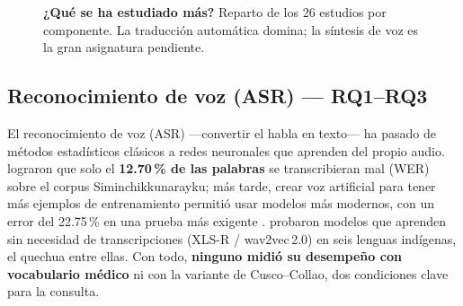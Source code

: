 \documentclass[10pt,twocolumn,a4paper]{article}
\begin{document}
\begin{figure}[t]
\centering
{}
\caption{\textbf{¿Qu\'e se ha estudiado m\'as?} Reparto de los 26 estudios por componente. La traducci\'on autom\'atica domina; la s\'intesis de voz es la gran asignatura pendiente.}
\label{fig:dist}
\end{figure}

\subsection*{Reconocimiento de voz (ASR) --- RQ1--RQ3}
El reconocimiento de voz (ASR) ---convertir el habla en texto--- ha pasado de m\'etodos estad\'isticos cl\'asicos a redes neuronales que aprenden del propio audio. \textcite{Zevallos202061} lograron que solo el \textbf{12.70\,\% de las palabras} se transcribieran mal (WER) sobre el corpus Siminchikkunarayku; m\'as tarde, crear voz artificial para tener m\'as ejemplos de entrenamiento permiti\'o usar modelos m\'as modernos, con un error del 22.75\,\% en una prueba m\'as exigente \parencite{Zevallos20223518}. \textcite{Chen20246444} probaron modelos que aprenden sin necesidad de transcripciones (XLS-R / wav2vec\,2.0) en seis lenguas ind\'igenas, el quechua entre ellas. Con todo, \textbf{ninguno midi\'o su desempe\~no con vocabulario m\'edico} ni con la variante de Cusco--Collao, dos condiciones clave para la consulta.
\end{document}
